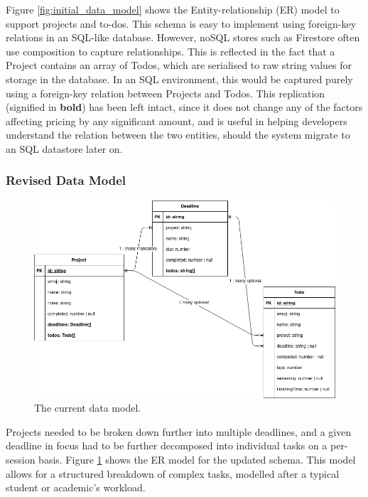 Figure \ref{fig:initial_data_model} shows the Entity-relationship (ER) model to support projects and to-dos. This schema is easy to implement using foreign-key relations in an SQL-like database. However, noSQL stores such as Firestore often use composition to capture relationships. This is reflected in the fact that a Project contains an array of Todos, which are serialised to raw string values for storage in the database. In an SQL environment, this would be captured purely using a foreign-key relation between Projects and Todos. This replication (signified in \textbf{bold}) has been left intact, since it does not change any of the factors affecting pricing by any significant amount, and is useful in helping developers understand the relation between the two entities, should the system migrate to an SQL datastore later on.

\subsubsection{Revised Data Model}
\begin{figure}[h]
    \begin{center}
        \includegraphics[scale=0.5]{images/final_data_model.png}
    \end{center}
    \caption{The current data model.}
    \label{fig:app_current_data_model}
\end{figure}

Projects needed to be broken down further into multiple deadlines, and a given deadline in focus had to be further decomposed into individual tasks on a per-session basis. Figure \ref{fig:app_current_data_model} shows the ER model for the updated schema. This model allows for a structured breakdown of complex tasks, modelled after a typical student or academic's workload.

